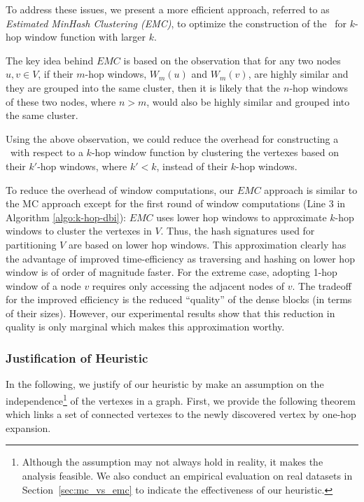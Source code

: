 To address these issues, we present a more efficient approach,
referred to as {\it Estimated MinHash Clustering (EMC)}, 
to optimize the construction of the \DBIndex\ for $k$-hop window function with larger $k$.

The key idea behind $EMC$ is based on the observation that for any two nodes $u, v \in V$,
if their $m$-hop windows, $W_m(u)$ and $W_m(v)$, are highly similar 
and they are grouped into the same cluster, 
then it is likely that the $n$-hop windows of these two nodes, where $n > m$,
would also be highly similar and grouped into the same cluster.

Using the above observation, we could reduce the overhead for constructing a \DBIndex\ with
respect to a $k$-hop window 
function by clustering the vertexes based on their $k'$-hop windows, where $k' < k$, instead of their $k$-hop windows.

To reduce the overhead of window computations,
our $EMC$ approach is similar to the MC approach except   
for the first round of window computations
(Line 3 in Algorithm \ref{algo:k-hop-dbi}):
$EMC$ uses lower hop windows to approximate $k$-hop windows 
to cluster the vertexes in $V$.
Thus, the hash signatures used for partitioning 
$V$ are based on lower hop windows.
This approximation clearly has the advantage of improved 
time-efficiency as traversing and hashing on lower hop window is of
order of magnitude faster. 
For the extreme case, adopting 1-hop window of a node $v$ requires only accessing the adjacent nodes of $v$. 
The tradeoff for the improved efficiency is the reduced ``quality''
of the dense blocks (in terms of their sizes).
However, our experimental results show that this reduction in 
quality is only marginal which makes this approximation worthy.

\subsubsection{Justification of Heuristic}
In the following, we justify of our heuristic by make
an assumption on the independence\footnote{Although the assumption may not always hold in reality, it makes the analysis feasible. We also conduct an empirical evaluation on real datasets in Section~\ref{sec:mc_vs_emc} to indicate the effectiveness of our heuristic.} of the 
vertexes in a graph. First, we provide the following theorem which
links a set of connected vertexes to the newly discovered vertex by one-hop
expansion.

